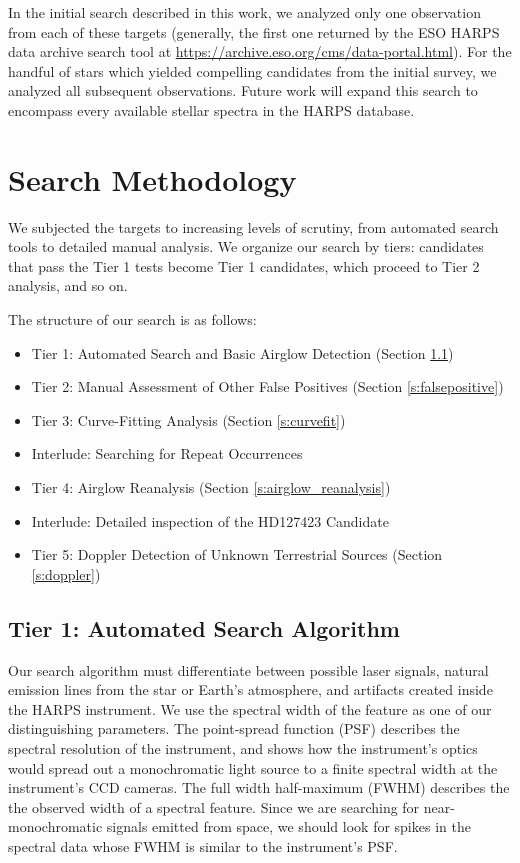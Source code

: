 \documentclass[twocolumn]{aastex701}
\begin{document}
In the initial search described in this work, we analyzed only one observation from each of these targets (generally, the first one returned by the ESO HARPS data archive search tool at \url{https://archive.eso.org/cms/data-portal.html}). For the handful of stars which yielded compelling candidates from the initial survey, we analyzed all subsequent observations. Future work will expand this search to encompass every available stellar spectra in the HARPS database.

\section{Search Methodology}
We subjected the targets to increasing levels of scrutiny, from automated search tools to detailed manual analysis.  We organize our search by tiers: candidates that pass the Tier 1 tests become Tier 1 candidates, which proceed to Tier 2 analysis, and so on.

The structure of our search is as follows:
\begin{itemize}
    \item Tier 1: Automated Search and Basic Airglow Detection (Section \ref{s:automated})
    \item Tier 2: Manual Assessment of Other False Positives (Section \ref{s:falsepositive})
    \item Tier 3: Curve-Fitting Analysis (Section \ref{s:curvefit})
    \item Interlude: Searching for Repeat Occurrences
    \item Tier 4: Airglow Reanalysis (Section \ref{s:airglow_reanalysis})
    \item Interlude: Detailed inspection of the HD127423 Candidate
    \item Tier 5: Doppler Detection of Unknown Terrestrial Sources (Section \ref{s:doppler})
\end{itemize}

\subsection{Tier  1: Automated Search Algorithm}
\label{s:automated}

Our search algorithm must differentiate between possible laser signals, natural emission lines from the star or Earth's atmosphere, and artifacts created inside the HARPS instrument.  We use the spectral width of the feature as one of our distinguishing parameters. The point-spread function (PSF) describes the spectral resolution of the instrument, and shows how the instrument's optics would spread out a monochromatic light source to a finite spectral width at the instrument's CCD cameras. The full width half-maximum (FWHM) describes the the observed width of a spectral feature.  Since we are searching for near-monochromatic signals emitted from space, we should look for spikes in the spectral data whose FWHM is similar to the instrument's PSF.
\end{document}
